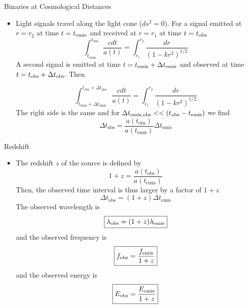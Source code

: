 \documentclass[size=11pt,style=paintings]{powerdot}
\begin{document}
  \begin{slide}{Binaries at Cosmological Distances}
 \begin{itemize}
 \item Light signals travel along the light cone ($ds^2=0$). For a signal emitted at $r=r_2$ at time $t=t_{\rm emis}$ and received at  $r=r_1$ at time $t=t_{\rm obs}$
$$
\int_{t_{\text {emis }}}^{t_{\text {obs }}} \frac{c d t}{a(t)}=\int_{r_1}^{r_2} \frac{d r}{\left(1-k r^{2}\right)^{1 / 2}}
$$
A second signal is emitted at time $t=t_{\rm emis}+\Delta t_{\rm emis}$ and observed at time $t=t_{\rm obs}+\Delta t_{\rm obs}$. Then

$$
\int_{t_{\mathrm{emis}}+\Delta t_{\mathrm{emis}}}^{t_{\mathrm{obs}}+\Delta t_{\mathrm{obs}}} \frac{c d t}{a(t)}=\int_{r_1}^{r_2} \frac{d r}{\left(1-k r^{2}\right)^{1 / 2}}
$$
The right side is the same and for $\Delta t_{\rm emis,obs}<< (t_{\rm obs}-t_{\rm emis})$ we find
$$
\Delta t_{\mathrm{obs}}=\frac{a\left(t_{\mathrm{obs}}\right)}{a\left(t_{\mathrm{emis}}\right)} \Delta t_{\mathrm{emis}}
$$

 \end{itemize}
 \end{slide}
 
  \begin{slide}{Redshift}
 \begin{itemize}
 \item The redshift $z$ of the source is defined by
 \vskip -0.2cm
 $$
1+z=\frac{a\left(t_{\mathrm{obs}}\right)}{a\left(t_{\mathrm{emis}}\right)}
$$
Then, the observed time interval is thus larger by a factor of $1+z$
\vskip -0.2cm
$$
\Delta t_{\mathrm{obs}}= (1+z)
\Delta t_{\mathrm{emis}}
$$
The observed wavelength is 
\vskip -0.2cm
$$
\boxed{\lambda_{\mathrm{obs}}=(1+z) \lambda_{\rm emis}}
$$
and the observed frequency is
\vskip -0.2cm
$$
\boxed{f_{\mathrm{obs}}=\frac{ f_{\rm emis}}{1+z}}
$$
and the observed energy is
\vskip -0.2cm
$$
\boxed{E_{\mathrm{obs}}=\frac{ E_{\rm emis}}{1+z}}
$$

 \end{itemize}
 \end{slide}
 
\end{document}
